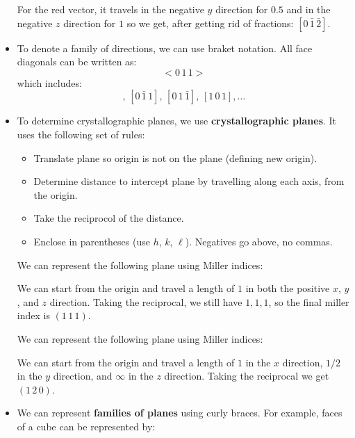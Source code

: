 \begin{itemize}
\begin{example}
        For the red vector, it travels in the negative $y$ direction for $0.5$ and in the negative $z$ direction for $1$ so we get, after getting rid of fractions: $[0\,\bar{1}\,\bar{2}]$.
    \end{example}
    \item To denote a family of directions, we can use braket notation. All face diagonals can be written as:
    \begin{equation}
        <0\,1\,1>
    \end{equation}
    which includes:
    \begin{equation}
        [0\,1\,1],\, [0\,\bar{1}\,1],\, [0\,1\,\bar{1}],\, [1\,0\,1], \dots
    \end{equation}
    \item To determine crystallographic planes, we use \textbf{crystallographic planes}. It uses the following set of rules:
    \begin{itemize}
        \item Translate plane so origin is not on the plane (defining new origin).
        \item Determine distance to intercept plane by travelling along each axis, from the origin.
        \item Take the reciprocol of the distance.
        \item Enclose in parentheses (use $h$, $k$, $\ell$). Negatives go above, no commas.
    \end{itemize}
    \begin{example}
        We can represent the following plane using Miller indices:
        \begin{center}
        \end{center}
        We can start from the origin and travel a length of $1$ in both the positive $x$, $y$, and $z$ direction. Taking the reciprocal, we still have $1,1,1$, so the final miller index is $(1\,1\,1)$.
    \end{example}
    \begin{example}
        We can represent the following plane using Miller indices:
        \begin{center}
        \end{center}
        We can start from the origin and travel a length of $1$ in the $x$ direction, $1/2$ in the $y$ direction, and $\infty$ in the $z$ direction. Taking the reciprocal we get $(1\,2\,0)$.
    \end{example}
    \item We can represent \textbf{families of planes} using curly braces. For example, faces of a cube can be represented by:

\end{itemize}
